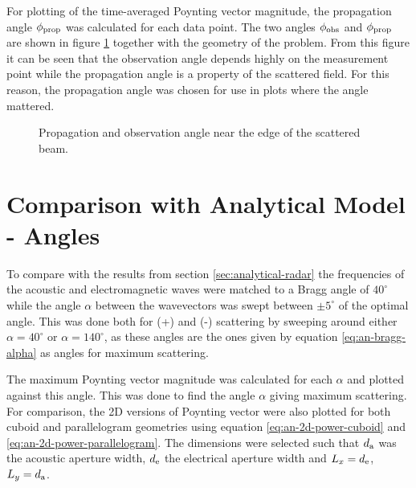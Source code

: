 \documentclass[11pt,twoside]{eitExjobb}
\begin{document}
	For plotting of the time-averaged Poynting vector magnitude, the propagation angle $\phi_{\mathrm{prop}}$ was calculated for each data point. The two angles $\phi_{\mathrm{obs}}$ and $\phi_{\mathrm{prop}}$ are shown in figure \ref{fig:sim-postproc-angles} together with the geometry of the problem. From this figure it can be seen that the observation angle depends highly on the measurement point while the propagation angle is a property of the scattered field. For this reason, the propagation angle was chosen for use in plots where the angle mattered.
	
	\begin{figure}[h]
		\centering
		
		\caption{\label{fig:sim-postproc-angles} Propagation and observation angle near the edge of the scattered beam.}
	\end{figure}
		
	\section{Comparison with Analytical Model - Angles}
	To compare with the results from section \ref{sec:analytical-radar} the frequencies of the acoustic and electromagnetic waves were matched to a Bragg angle of $40^\circ$ while the angle $\alpha$ between the wavevectors was swept between $\pm 5^\circ$ of the optimal angle. This was done both for (+) and (-) scattering by sweeping around either $\alpha = 40^\circ$ or $\alpha = 140^\circ$, as these angles are the ones given by equation \eqref{eq:an-bragg-alpha} as angles for maximum scattering.
	
	The maximum Poynting vector magnitude was calculated for each $\alpha$ and plotted against this angle. This was done to find the angle $\alpha$ giving maximum scattering. For comparison, the 2D versions of Poynting vector were also plotted for both cuboid and parallelogram geometries using equation \eqref{eq:an-2d-power-cuboid} and \eqref{eq:an-2d-power-parallelogram}. The dimensions were selected such that $d_{\mathrm{a}}$ was the acoustic aperture width, $d_{\mathrm{e}}$ the electrical aperture width and $L_x = d_{\mathrm{e}}$, $L_y = d_{\mathrm{a}}$. 
	
\end{document}
